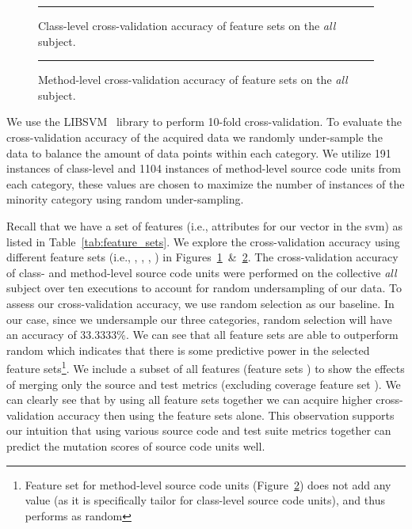 \begin{figure}[!ht]
  \centering
  \begin{adjustbox}{max size={.95\textwidth}{.95\textheight}}
    
  \end{adjustbox}
  \caption{Class-level cross-validation accuracy of feature sets on the \emph{all} subject.}
  \vspace{2mm}
  \hrule
  \label{fig:all_cross_validation_features_class_graph}
\end{figure}

\begin{figure}[!ht]
  \centering
  \begin{adjustbox}{max size={.95\textwidth}{.95\textheight}}
    
  \end{adjustbox}
  \caption{Method-level cross-validation accuracy of feature sets on the \emph{all} subject.}
  \vspace{2mm}
  \hrule
  \label{fig:all_cross_validation_features_method_graph}
\end{figure}

We use the LIBSVM~\cite{CL11} library to perform 10-fold cross-validation. To evaluate the cross-validation accuracy of the acquired data we randomly under-sample the data to balance the amount of data points within each category. We utilize 191 instances of class-level and 1104 instances of method-level source code units from each category, these values are chosen to maximize the number of instances of the minority category using random under-sampling.

Recall that we have a set of features (i.e., attributes for our vector in the \gls{svm}) as listed in Table~\ref{tab:feature_sets}. We explore the cross-validation accuracy using different feature sets (i.e., , , , ) in Figures~\ref{fig:all_cross_validation_features_class_graph}~\&~\ref{fig:all_cross_validation_features_method_graph}. The cross-validation accuracy of class- and method-level source code units were performed on the collective \emph{all} subject over ten executions to account for random undersampling of our data. To assess our cross-validation accuracy, we use random selection as our baseline. In our case, since we undersample our three categories, random selection will have an accuracy of 33.3333\%. We can see that all feature sets are able to outperform random which indicates that there is some predictive power in the selected feature sets\footnote{Feature set  for method-level source code units (Figure~\ref{fig:all_cross_validation_features_method_graph}) does not add any value (as it is specifically tailor for class-level source code units), and thus performs as random}. We include a subset of all features (feature sets   ) to show the effects of merging only the source and test metrics (excluding coverage feature set ). We can clearly see that by using all feature sets together we can acquire higher cross-validation accuracy then using the feature sets alone. This observation supports our intuition that using various source code and test suite metrics together can predict the mutation scores of source code units well.

